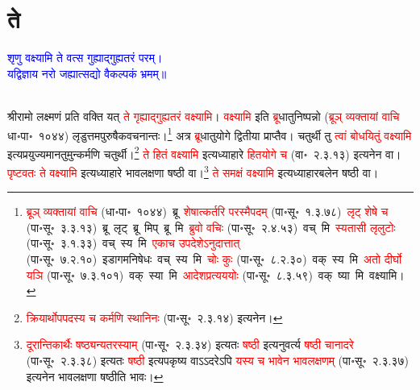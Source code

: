 \section[ते]{ते}
\centering\textcolor{blue}{शृणु वक्ष्यामि ते वत्स गुह्याद्गुह्यतरं परम्।\nopagebreak\\
यद्विज्ञाय नरो जह्यात्सद्यो वैकल्पकं भ्रमम्॥}\nopagebreak\\
\\
\begin{sloppypar}\justifying\noindent\hspace{10mm} श्रीरामो लक्ष्मणं प्रति वक्ति यत् \textcolor{red}{ते गृह्याद्गुह्यतरं वक्ष्यामि}। \textcolor{red}{वक्ष्यामि} इति \textcolor{red}{ब्रू}\-धातु\-निष्पन्नो (\textcolor{red}{ब्रूञ् व्यक्तायां वाचि} धा॰पा॰~१०४४) लृडुत्तम\-पुरुषैक\-वचनान्तः।\footnote{\textcolor{red}{ब्रूञ् व्यक्तायां वाचि} (धा॰पा॰~१०४४)~\arrow ब्रू~\arrow \textcolor{red}{शेषात्कर्तरि परस्मैपदम्} (पा॰सू॰~१.३.७८)~\arrow \textcolor{red}{लृट् शेषे च} (पा॰सू॰~३.३.१३)~\arrow ब्रू~लृट्~\arrow ब्रू~मिप्~\arrow ब्रू~मि~\arrow \textcolor{red}{ब्रुवो वचिः} (पा॰सू॰~२.४.५३)~\arrow वच्~मि~\arrow \textcolor{red}{स्यतासी लृलुटोः} (पा॰सू॰~३.१.३३)~\arrow वच्~स्य~मि~\arrow \textcolor{red}{एकाच उपदेशेऽनुदात्तात्‌} (पा॰सू॰~७.२.१०)~\arrow इडागम\-निषेधः~\arrow वच्~स्य~मि~\arrow \textcolor{red}{चोः कुः} (पा॰सू॰~८.२.३०)~\arrow वक्~स्य~मि~\arrow \textcolor{red}{अतो दीर्घो यञि} (पा॰सू॰~७.३.१०१)~\arrow वक्~स्या~मि~\textcolor{red}{आदेश\-प्रत्यययोः} (पा॰सू॰~८.३.५९)~\arrow वक्~ष्या~मि~\arrow वक्ष्यामि।} अत्र \textcolor{red}{ब्रू}\-धातु\-योगे द्वितीया प्राप्तैव। चतुर्थी तु \textcolor{red}{त्वां बोधयितुं वक्ष्यामि} इत्यप्रयुज्यमान\-तुमुन्कर्मणि चतुर्थी।\footnote{\textcolor{red}{क्रियार्थोपपदस्य च कर्मणि स्थानिनः} (पा॰सू॰~२.३.१४) इत्यनेन।} \textcolor{red}{ते हितं वक्ष्यामि} इत्यध्याहारे \textcolor{red}{हित\-योगे च} (वा॰~२.३.१३) इत्यनेन वा। \textcolor{red}{पृष्टवतः ते वक्ष्यामि} इत्यध्याहारे भाव\-लक्षणा षष्ठी वा।\footnote{\textcolor{red}{दूरान्तिकार्थैः षष्ठ्यन्यतरस्याम्‌} (पा॰सू॰~२.३.३४) इत्यतः \textcolor{red}{षष्ठी} इत्यनुवर्त्य \textcolor{red}{षष्ठी चानादरे} (पा॰सू॰~२.३.३८) इत्यतः \textcolor{red}{षष्ठी} इत्यपकृष्य वाऽऽदरेऽपि \textcolor{red}{यस्य च भावेन भाव\-लक्षणम्‌} (पा॰सू॰~२.३.३७) इत्यनेन भावलक्षणा षष्ठीति भावः।} \textcolor{red}{ते समक्षं वक्ष्यामि} इत्यध्याहार\-बलेन षष्ठी वा।\end{sloppypar}
